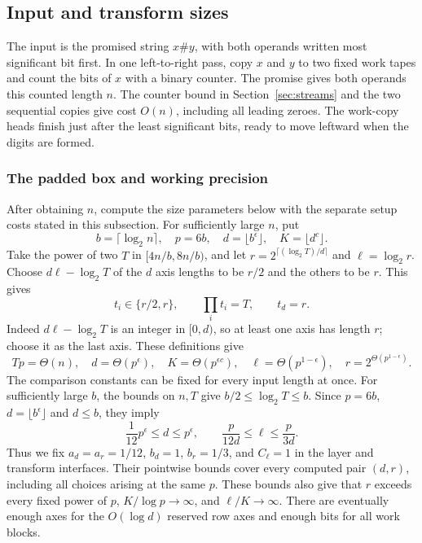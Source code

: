 \subsection{Input and transform sizes}

The input is the promised string $x\#y$, with both operands written
most significant bit first.  In one left-to-right pass, copy $x$ and
$y$ to two fixed work tapes and count the bits of $x$ with a binary
counter.  The promise gives both operands this counted length $n$.
The counter bound in Section~\ref{sec:streams} and the two sequential
copies give cost $O(n)$, including all leading zeroes.  The work-copy
heads finish just after the least significant bits, ready to move
leftward when the digits are formed.

\subsubsection{The padded box and working precision}

After obtaining $n$, compute the size parameters below with the
separate setup costs stated in this subsection.  For sufficiently
large $n$, put
\[
 b=\lceil\log_2n\rceil,\quad p=6b,\quad d=\lfloor b^\epsilon\rfloor,
 \quad K=\lfloor d^c\rfloor.
\]
Take the power of two $T$ in $[4n/b,8n/b)$, and let
$r=2^{\lceil(\log_2T)/d\rceil}$ and $\ell=\log_2r$.  Choose
$d\ell-\log_2T$ of the $d$ axis lengths to be $r/2$ and the others to
be $r$.  This gives
\[
 t_i\in\{r/2,r\},\qquad \prod_i t_i=T,\qquad t_d=r.
\]
Indeed $d\ell-\log_2T$ is an integer in $[0,d)$, so at least one axis
has length $r$; choose it as the last axis.
These definitions give
\begin{equation}\label{eq:sizes}
 Tp=\Theta(n),\quad d=\Theta(p^\epsilon),\quad
 K=\Theta(p^{\epsilon c}),\quad
 \ell=\Theta(p^{1-\epsilon}),\quad r=2^{\Theta(p^{1-\epsilon})}.
\end{equation}
The comparison constants can be fixed for every input length at once.
For sufficiently large $b$, the bounds on $n,T$ give
$b/2\leq\log_2T\leq b$. Since $p=6b$, $d=\lfloor b^\epsilon\rfloor$
and $d\leq b$, they imply
\[
 \frac1{12}p^\epsilon\leq d\leq p^\epsilon,
 \qquad \frac{p}{12d}\leq\ell\leq\frac{p}{3d}.
\]
Thus we fix $a_d=a_r=1/12$, $b_d=1$, $b_r=1/3$, and $C_\ell=1$
in the layer and transform interfaces. Their pointwise bounds cover every
computed pair $(d,r)$, including all choices arising at the same $p$.
These bounds also give that $r$ exceeds every fixed power of $p$,
$K/\log p\to\infty$, and
$\ell/K\to\infty$.  There are eventually enough axes for the
$O(\log d)$ reserved row axes and enough bits for all work blocks.


